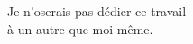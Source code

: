 \clearpage
\thispagestyle{plain}

\par\vspace*{.25\textheight}
\begin{flushright}
  Je n'oserais pas dédier ce travail \\à un autre que moi-même.
\end{flushright}
